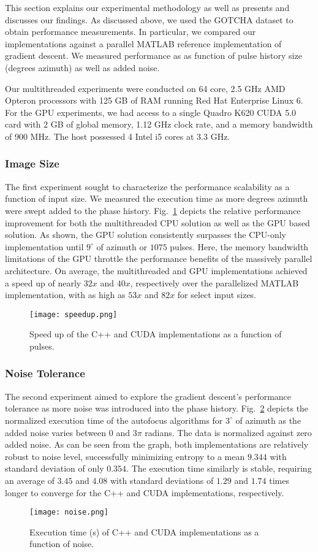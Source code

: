 This section explains our experimental methodology as well as presents and
discusses our findings. As discussed above, we used the GOTCHA dataset to
obtain performance measurements. In particular, we compared our implementations
against a parallel MATLAB reference implementation of gradient descent. We
measured performance as as function of pulse history size (degrees azimuth) as
well as added noise.

Our multithreaded experiments were conducted on 64 core, 2.5 GHz AMD Opteron
processors with 125 GB of RAM running Red Hat Enterprise Linux 6. For the GPU
experiments, we had access to a single Quadro K620 CUDA 5.0 card with 2 GB of
global memory, 1.12 GHz clock rate, and a memory bandwidth of 900 MHz. The host
possessed 4 Intel i5 cores at 3.3 GHz.

\subsubsection{Image Size}

The first experiment sought to characterize the performance scalability as a
function of input size. We measured the execution time as more degrees azimuth
were swept added to the phase history. Fig.~\ref{fig:speedup} depicts the
relative performance improvement for both the multithreaded CPU solution as well
as the GPU based solution. As shown, the GPU solution consistently surpasses the
CPU-only implementation until $9^{\circ}$ of azimuth or $1075$ pulses. Here, the
memory bandwidth limitations of the GPU throttle the performance benefits of the
massively parallel architecture. On average, the multithreaded and GPU
implementations achieved a speed up of nearly $32x$ and $40x$, respectively over
the parallelized MATLAB implementation, with as high as $53x$ and $82x$ for select
input sizes.

\begin{figure}
  \centering
  \texttt{[image: speedup.png]}
  \vspace{5 mm}
  \caption{Speed up of the C++ and CUDA implementations as a function of pulses.}
  \label{fig:speedup}
\end{figure}

\subsubsection{Noise Tolerance}

The second experiment aimed to explore the gradient descent's performance
tolerance as more noise was introduced into the phase history.
Fig.~\ref{fig:noise} depicts the normalized execution time of the
autofocus algorithms for $3^{\circ}$ of azimuth as the added noise varies
between $0$ and $3\pi$ radians. The data is normalized against zero added noise.
As can be seen from the graph, both implementations are relatively robust to
noise level, successfully minimizing entropy to a mean $9.344$ with standard
deviation of only $0.354$. The execution time similarly is stable, requiring an
average of $3.45$ and $4.08$ with standard deviations of $1.29$ and $1.74$ times
longer to converge for the C++ and CUDA implementations, respectively.

\begin{figure}
  \centering
  \texttt{[image: noise.png]}
  \vspace{5 mm}
  \caption{Execution time (s) of C++ and CUDA implementations as a function of
  noise.}
  \label{fig:noise}
\end{figure}
